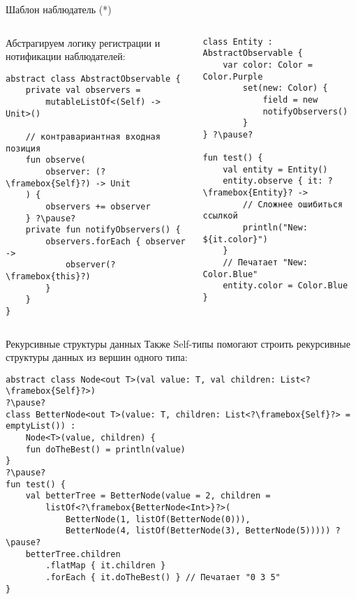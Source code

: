 \documentclass[handout,aspectratio=169,usenames,dvipsnames]{beamer}
\begin{document}
\begin{frame}[fragile]{Шаблон наблюдатель (*)}
    \begin{columns}
        \begin{column}{0.48\textwidth}
            Абстрагируем логику регистрации и нотификации наблюдателей:
            \begin{verbatim}
abstract class AbstractObservable {
    private val observers =
        mutableListOf<(Self) -> Unit>()

    // контравариантная входная позиция
    fun observe(
        observer: (?\framebox{Self}?) -> Unit
    ) {
        observers += observer
    } ?\pause?
    private fun notifyObservers() {
        observers.forEach { observer ->
            observer(?\framebox{this}?)
        }
    }
}
            \end{verbatim}
        \end{column}
        \pause
        \begin{column}{0.49\textwidth}
            \vspace{-0.5em}
            \begin{verbatim}
class Entity : AbstractObservable {
    var color: Color = Color.Purple
        set(new: Color) {
            field = new
            notifyObservers()
        }
} ?\pause?

fun test() {
    val entity = Entity()
    entity.observe { it: ?\framebox{Entity}? ->
        // Сложнее ошибиться ссылкой
        println("New: ${it.color}")
    }
    // Печатает "New: Color.Blue"
    entity.color = Color.Blue
}
            \end{verbatim}
        \end{column}
    \end{columns}
\end{frame}

\begin{frame}[fragile]{Рекурсивные структуры данных}
    Также Self-типы помогают строить рекурсивные структуры данных из вершин одного типа:
    \begin{verbatim}
abstract class Node<out T>(val value: T, val children: List<?\framebox{Self}?>)
?\pause?
class BetterNode<out T>(value: T, children: List<?\framebox{Self}?> = emptyList()) :
    Node<T>(value, children) {
    fun doTheBest() = println(value)
}
?\pause?
fun test() {
    val betterTree = BetterNode(value = 2, children =
        listOf<?\framebox{BetterNode<Int>}?>(
            BetterNode(1, listOf(BetterNode(0))),
            BetterNode(4, listOf(BetterNode(3), BetterNode(5))))) ?\pause?
    betterTree.children
        .flatMap { it.children }
        .forEach { it.doTheBest() } // Печатает "0 3 5"
}
    \end{verbatim}
\end{frame}
\end{document}
